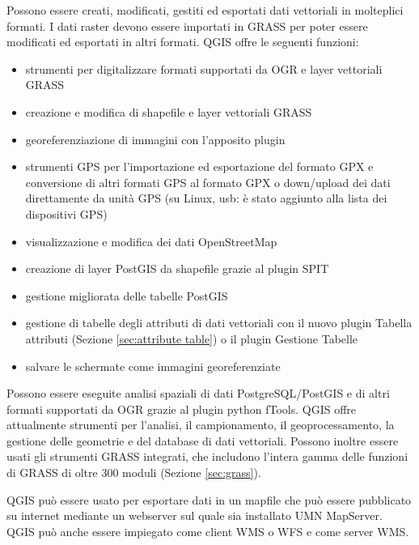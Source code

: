 
Possono essere creati, modificati, gestiti ed esportati dati vettoriali in molteplici formati. 
I dati raster devono essere importati in GRASS per poter essere modificati ed esportati in 
altri formati. QGIS offre le seguenti funzioni:

\begin{itemize}[label=--]
\item strumenti per digitalizzare formati supportati da OGR e layer vettoriali GRASS
\item creazione e modifica di shapefile e layer vettoriali GRASS
\item georeferenziazione di immagini con l’apposito plugin
\item strumenti GPS per l’importazione ed esportazione del formato GPX e conversione di altri formati
GPS al formato GPX o down/upload dei dati direttamente da unità GPS (su Linux, usb: è
stato aggiunto alla lista dei dispositivi GPS)
\item visualizzazione e modifica dei dati OpenStreetMap
\item creazione di layer PostGIS da shapefile grazie al plugin SPIT 
\item gestione migliorata delle tabelle PostGIS
\item gestione di tabelle degli attributi di dati vettoriali con il nuovo plugin Tabella attributi 
(Sezione \ref{sec:attribute table}) o il plugin Gestione Tabelle
\item salvare le schermate come immagini georeferenziate
\end{itemize}


Possono essere eseguite analisi spaziali di dati PostgreSQL/PostGIS e di altri
formati supportati da OGR grazie al plugin python fTools. QGIS
offre attualmente strumenti per l'analisi, il campionamento, il geoprocessamento,
la gestione delle geometrie e del database di dati vettoriali. Possono
inoltre essere usati gli strumenti GRASS integrati, che includono
l'intera gamma delle funzioni di GRASS di oltre 300 moduli (Sezione \ref{sec:grass}).


QGIS può essere usato per esportare dati in un mapfile che può essere
pubblicato su internet mediante un webserver sul quale sia installato
UMN MapServer. QGIS può anche essere impiegato come client WMS o
WFS e come server WMS. 

